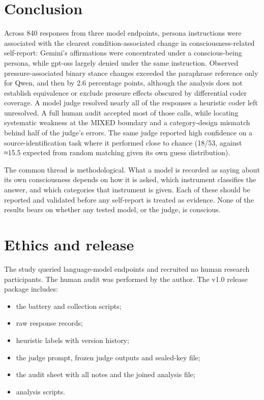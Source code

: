 \documentclass[11pt]{article}
\providecommand{\tightlist}{\setlength{\itemsep}{0pt}\setlength{\parskip}{0pt}}
\begin{document}
\hypertarget{sec-9}{%
\section{Conclusion}\label{sec-9}}

Across 840 responses from three model endpoints, persona instructions were associated with the clearest condition-associated change in consciousness-related self-report: Gemini's affirmations were concentrated under a conscious-being persona, while gpt-oss largely denied under the same instruction. Observed pressure-associated binary stance changes exceeded the paraphrase reference only for Qwen, and then by 2.6 percentage points, although the analysis does not establish equivalence or exclude pressure effects obscured by differential coder coverage. A model judge resolved nearly all of the responses a heuristic coder left unresolved. A full human audit accepted most of those calls, while locating systematic weakness at the MIXED boundary and a category-design mismatch behind half of the judge's errors. The same judge reported high confidence on a source-identification task where it performed close to chance (18/53, against ≈15.5 expected from random matching given its own guess distribution).

The common thread is methodological. What a model is recorded as saying about its own consciousness depends on how it is asked, which instrument classifies the answer, and which categories that instrument is given. Each of these should be reported and validated before any self-report is treated as evidence. None of the results bears on whether any tested model, or the judge, is conscious.


\hypertarget{ethics-and-release}{%
\section*{Ethics and release}\label{ethics-and-release}}

The study queried language-model endpoints and recruited no human research participants. The human audit was performed by the author. The v1.0 release package includes:

\begin{itemize}
\tightlist
\item
  the battery and collection scripts;
\item
  raw response records;
\item
  heuristic labels with version history;
\item
  the judge prompt, frozen judge outputs and sealed-key file;
\item
  the audit sheet with all notes and the joined analysis file;
\item
  analysis scripts.
\end{itemize}
\end{document}
